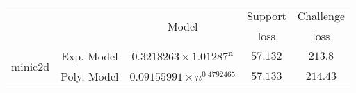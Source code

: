 \begin{tabular}{ccccc} 
\hline 
 &  & \multirow{2}{*}{Model} & Support & Challenge\tabularnewline 
 &  &  & loss  & loss\tabularnewline 
\hline 
\hline 
\multirow{2}{*}{minic2d} & Exp. Model & $\mathbf{0.3218263\times 1.01287^{n}}$ & $\mathbf{57.132}$ & $\mathbf{213.8}$ \tabularnewline 
 & Poly. Model & $0.09155991\times n^{0.4792465}$ & $57.133$ & $214.43$ \tabularnewline 
\hline 
\end{tabular} 

